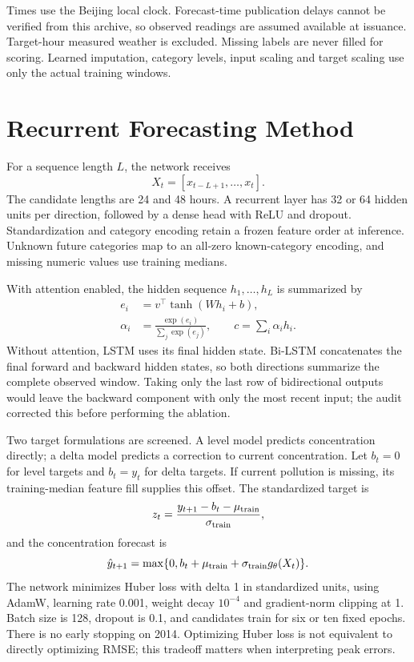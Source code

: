 \documentclass[conference]{IEEEtran}
\begin{document}
Times use the Beijing local clock. Forecast-time publication delays cannot be verified from this archive, so observed readings are assumed available at issuance. Target-hour measured weather is excluded. Missing labels are never filled for scoring. Learned imputation, category levels, input scaling and target scaling use only the actual training windows.

\section{Recurrent Forecasting Method}
For a sequence length $L$, the network receives
\begin{equation}
X_t=[x_{t-L+1},\ldots,x_t].
\end{equation}
The candidate lengths are 24 and 48 hours. A recurrent layer has 32 or 64 hidden units per direction, followed by a dense head with ReLU and dropout. Standardization and category encoding retain a frozen feature order at inference. Unknown future categories map to an all-zero known-category encoding, and missing numeric values use training medians.

With attention enabled, the hidden sequence $h_1,\ldots,h_L$ is summarized by
\begin{align}
e_i &= v^\top\tanh(Wh_i+b),\\
\alpha_i &= \frac{\exp(e_i)}{\sum_j\exp(e_j)},\qquad
c = \sum_i \alpha_i h_i.
\end{align}
Without attention, LSTM uses its final hidden state. Bi-LSTM concatenates the final forward and backward hidden states, so both directions summarize the complete observed window. Taking only the last row of bidirectional outputs would leave the backward component with only the most recent input; the audit corrected this before performing the ablation.

Two target formulations are screened. A level model predicts concentration directly; a delta model predicts a correction to current concentration. Let $b_t=0$ for level targets and $b_t=y_t$ for delta targets. If current pollution is missing, its training-median feature fill supplies this offset. The standardized target is
\begin{equation}
z_t=\frac{y_{t+1}-b_t-\mu_{\rm train}}{\sigma_{\rm train}},
\end{equation}
and the concentration forecast is
\begin{equation}
\hat y_{t+1}=\max\{0,b_t+\mu_{\rm train}+\sigma_{\rm train}g_\theta(X_t)\}.
\end{equation}
The network minimizes Huber loss with delta 1 in standardized units, using AdamW, learning rate 0.001, weight decay $10^{-4}$ and gradient-norm clipping at 1. Batch size is 128, dropout is 0.1, and candidates train for six or ten fixed epochs. There is no early stopping on 2014. Optimizing Huber loss is not equivalent to directly optimizing RMSE; this tradeoff matters when interpreting peak errors.
\end{document}
